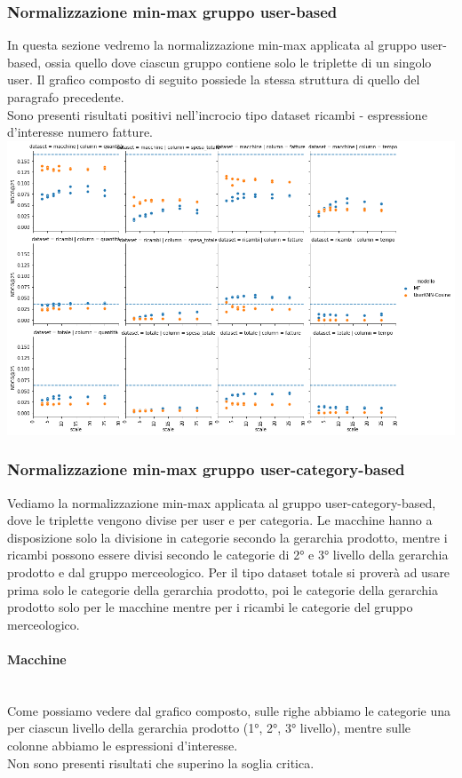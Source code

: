 \subsubsection{Normalizzazione min-max gruppo user-based}
In questa sezione vedremo la normalizzazione min-max applicata al gruppo user-based, ossia quello dove ciascun gruppo contiene solo le triplette di un singolo user. Il grafico composto di seguito possiede la stessa struttura di quello del paragrafo precedente.\\
Sono presenti risultati positivi nell'incrocio tipo dataset ricambi - espressione d'interesse numero fatture.\\
\includegraphics[width=16cm]{figures/risultati_minmax_singolo.png}
\newpage
\subsubsection{Normalizzazione min-max gruppo user-category-based}
Vediamo la normalizzazione min-max applicata al gruppo user-category-based, dove le triplette vengono divise per user e per categoria.
Le macchine hanno a disposizione solo la divisione in categorie secondo la gerarchia prodotto, mentre i ricambi possono essere divisi secondo le categorie di 2° e 3° livello della gerarchia prodotto e dal gruppo merceologico. Per il tipo dataset totale si proverà ad usare prima solo le categorie della gerarchia prodotto, poi le categorie della gerarchia prodotto solo per le macchine mentre per i ricambi le categorie del gruppo merceologico.

\paragraph{Macchine}\mbox{} \\
Come possiamo vedere dal grafico composto, sulle righe abbiamo le categorie una per ciascun livello della gerarchia prodotto (1°, 2°, 3° livello), mentre sulle colonne abbiamo le espressioni d'interesse. \\
Non sono presenti risultati che superino la soglia critica.\\

